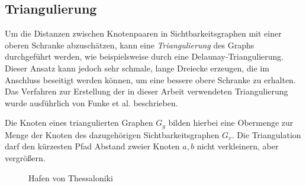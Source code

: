 \subsection{Triangulierung}

Um die Distanzen zwischen Knotenpaaren in Sichtbarkeitsgraphen mit einer oberen Schranke abzuschätzen, kann eine \emph{Triangulierung} des Graphs durchgeführt werden, wie beispielsweise durch eine Delaunay-Triangulierung.
Dieser Ansatz kann jedoch sehr schmale, lange Dreiecke erzeugen, die im Anschluss beseitigt werden können, um eine bessere obere Schranke zu erhalten.
Das Verfahren zur Erstellung der in dieser Arbeit verwendeten Triangulierung wurde ausführlich von Funke et al. \cite{funkescalable} beschrieben.

Die Knoten eines triangulierten Graphen $G_g$ bilden hierbei eine Obermenge zur Menge der Knoten des dazugehörigen Sichtbarkeitsgraphen $G_v$.
Die Triangulation darf den kürzesten Pfad Abstand zweier Knoten $a, b$ nicht verkleinern, aber vergrößern.

\begin{figure}[h!]%
  \centering
  \caption{Hafen von Thessaloniki}%
  \label{fig:thessaloniki_comparison}%
\end{figure}

